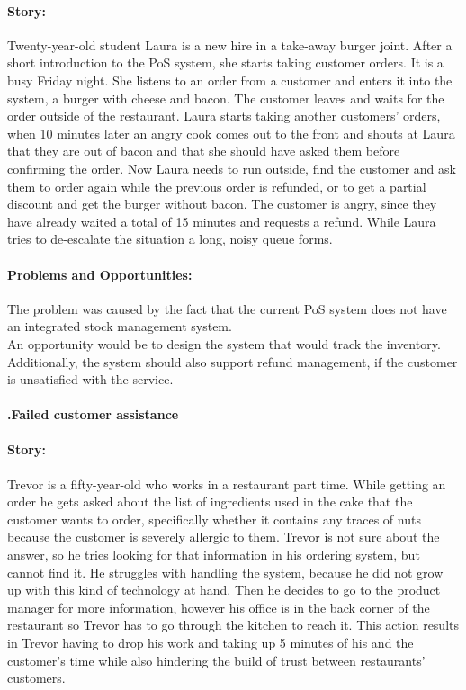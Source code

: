\documentclass{article}
\newcounter{subsubsubsection}[subsubsection]
\renewcommand\thesubsubsubsection{\thesubsubsection.\arabic{subsubsubsection}}
\newcommand\subsubsubsection[1]{
  \refstepcounter{subsubsubsection}
  \paragraph{\thesubsubsubsection\quad #1}
}
\begin{document}
\paragraph{\small Story:} Twenty-year-old student Laura is a new hire in a take-away burger joint. After a short introduction to the PoS system, she starts taking customer orders. It is a busy Friday night. She listens to an order from a customer and enters it into the system, a burger with cheese and bacon. The customer leaves and waits for the order outside of the restaurant. Laura starts taking another customers' orders, when 10 minutes later an angry cook comes out to the front and shouts at Laura that they are out of bacon and that she should have asked them before confirming the order. Now Laura needs to run outside, find the customer and ask them to order again while the previous order is refunded, or to get a partial discount and get the burger without bacon. The customer is angry, since they have already waited a total of 15 minutes and requests a refund. While Laura tries to de-escalate the situation a long, noisy queue forms.
\paragraph{\small Problems and Opportunities:} The problem was caused by the fact that the current PoS system does not have an integrated stock management system.\\ An opportunity would be to design the system that would track the inventory. Additionally, the system should also support refund management, if the customer is unsatisfied with the service.

\subsubsubsection{Failed customer assistance}
\label{Failed customer assistance}
\paragraph{\small Story:} Trevor is a fifty-year-old who works in a restaurant part time. While getting an order he gets asked about the list of ingredients used in the cake that the customer wants to order, specifically whether it contains any traces of nuts because the customer is severely allergic to them. Trevor is not sure about the answer, so he tries looking for that information in his ordering system, but cannot find it. He struggles with handling the system, because he did not grow up with this kind of technology at hand. Then he decides to go to the product manager for more information, however his office is in the back corner of the restaurant so Trevor has to go through the kitchen to reach it. This action results in Trevor having to drop his work and taking up 5 minutes of his and the customer's time while also hindering the build of trust between restaurants' customers.
\end{document}

